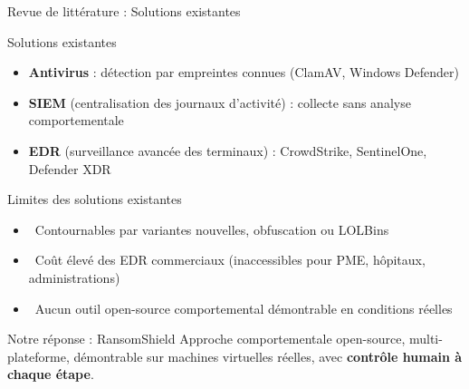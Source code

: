 \documentclass[aspectratio=169,t,10pt]{beamer}
\newcommand{\bad} {\textcolor{crit}{\faTimesCircle}\ }
\begin{document}
\begin{frame}{Revue de littérature : Solutions existantes}

  \begin{block}{Solutions existantes}
    \begin{itemize}\setlength\itemsep{2pt}
      \item \textbf{Antivirus} : détection par empreintes connues (ClamAV, Windows Defender)
      \item \textbf{SIEM} {\tiny\color{muted}(centralisation des journaux d'activité)} : collecte sans analyse comportementale
      \item \textbf{EDR} {\tiny\color{muted}(surveillance avancée des terminaux)} : CrowdStrike, SentinelOne, Defender XDR
    \end{itemize}
  \end{block}

  \vspace{4pt}

  \begin{block}{Limites des solutions existantes}
    \begin{itemize}\setlength\itemsep{2pt}
      \item \bad Contournables par variantes nouvelles, obfuscation ou LOLBins
      \item \bad Coût élevé des EDR commerciaux (inaccessibles pour PME, hôpitaux, administrations)
      \item \bad Aucun outil open-source comportemental démontrable en conditions réelles
    \end{itemize}
  \end{block}

  \vspace{4pt}

  \begin{alertblock}{Notre réponse : RansomShield}
    Approche comportementale open-source, multi-plateforme, démontrable sur
    machines virtuelles réelles, avec \textbf{contrôle humain à chaque étape}.
  \end{alertblock}

\end{frame}
\end{document}

